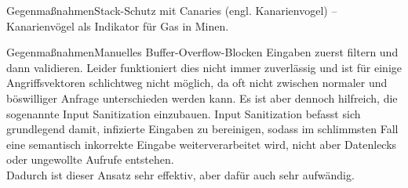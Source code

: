 \begin{frame}{Gegenmaßnahmen}{Stack-Schutz mit Canaries} 
    (engl. Kanarienvogel) -- Kanarienvögel als
    Indikator für Gas in Minen. 
    
    
\end{frame}


\begin{frame}{Gegenmaßnahmen}{Manuelles Buffer-Overflow-Blocken}
    Eingaben zuerst filtern und dann validieren.
    Leider funktioniert dies nicht immer zuverlässig und ist für einige Angriffsvektoren schlichtweg nicht
    möglich, da oft nicht zwischen normaler und böswilliger Anfrage unterschieden werden kann. 
    Es ist aber dennoch hilfreich, die sogenannte Input Sanitization einzubauen.
    Input Sanitization befasst sich grundlegend damit, infizierte Eingaben zu bereinigen, 
    sodass im schlimmsten Fall eine semantisch inkorrekte Eingabe weiterverarbeitet
    wird, nicht aber Datenlecks oder ungewollte Aufrufe entstehen. \\
    Dadurch ist dieser Ansatz sehr effektiv, aber dafür auch sehr aufwändig.
    
    
\end{frame}

